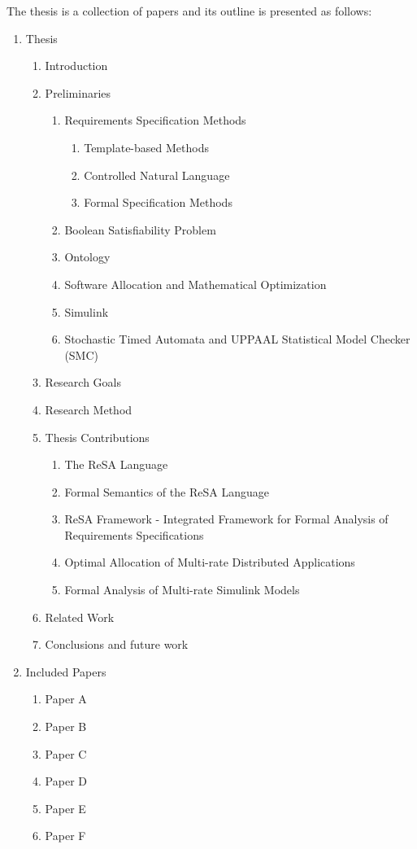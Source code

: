 The thesis is a collection of papers and its outline is presented as follows:

\begin{enumerate}[I]\bfseries
\item Thesis
	\begin{enumerate}[1]
		\item Introduction
		\item Preliminaries
		\begin{enumerate}[2.1]\mdseries
			\item Requirements Specification Methods
            \begin{enumerate}
              \item Template-based Methods
              \item Controlled Natural Language
              \item Formal Specification Methods
            \end{enumerate}
			\item Boolean Satisfiability Problem
			\item Ontology
			\item Software Allocation and Mathematical Optimization
			\item Simulink
			\item Stochastic Timed Automata and UPPAAL Statistical Model Checker (SMC) 
			
		\end{enumerate}
    		\item Research Goals
    		\item Research Method
    		\item Thesis Contributions
		    \begin{enumerate}[5.1]\mdseries
    			\item The ReSA Language
    			\item Formal Semantics of the ReSA Language
    			\item ReSA Framework - Integrated Framework for Formal Analysis of Requirements Specifications
    			\item Optimal Allocation of Multi-rate Distributed Applications
    			\item Formal Analysis of Multi-rate Simulink Models
		    \end{enumerate}
		\item Related Work		
		\item Conclusions and future work
	\end{enumerate}
\item Included Papers
	\begin{enumerate}[1]
		\item Paper A
		\item Paper B
		\item Paper C
		\item Paper D
		\item Paper E
		\item Paper F
	\end{enumerate}
\end{enumerate} 
\pagebreak